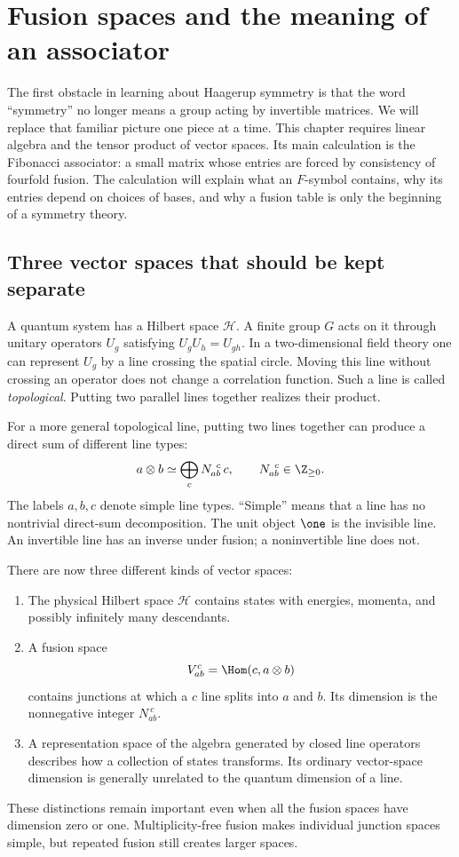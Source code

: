 \chapter{Fusion spaces and the meaning of an associator}
\label{ch:fusion}

The first obstacle in learning about Haagerup symmetry is that the word
``symmetry'' no longer means a group acting by invertible matrices.  We
will replace that familiar picture one piece at a time.  This chapter
requires linear algebra and the tensor product of vector spaces.  Its
main calculation is the Fibonacci associator: a small matrix whose
entries are forced by consistency of fourfold fusion.  The calculation
will explain what an $F$-symbol contains, why its entries depend on
choices of bases, and why a fusion table is only the beginning of a
symmetry theory.

\section{Three vector spaces that should be kept separate}

A quantum system has a Hilbert space $\mathscr H$.  A finite group $G$
acts on it through unitary operators $U_g$ satisfying
$U_gU_h=U_{gh}$.  In a two-dimensional field theory one can represent
$U_g$ by a line crossing the spatial circle.  Moving this line without
crossing an operator does not change a correlation function.  Such a
line is called \emph{topological}.  Putting two parallel lines together
realizes their product.

For a more general topological line, putting two lines together can
produce a direct sum of different line types:
\begin{equation}
 a\otimes b\simeq\bigoplus_c N_{ab}^{\ c}\,c,
 \qquad N_{ab}^{\ c}\in\Z_{\geq0}.
 \label{eq:fusion-rule-general}
\end{equation}
The labels $a,b,c$ denote simple line types.  ``Simple'' means that a
line has no nontrivial direct-sum decomposition.  The unit object
$\one$ is the invisible line.  An invertible line has an inverse under
fusion; a noninvertible line does not.

There are now three different kinds of vector spaces:
\begin{enumerate}
\item The physical Hilbert space $\mathscr H$ contains states with
energies, momenta, and possibly infinitely many descendants.
\item A fusion space
\[
 V_{ab}^{c}=\Hom(c,a\otimes b)
\]
contains junctions at which a $c$ line splits into $a$ and $b$.
Its dimension is the nonnegative integer $N_{ab}^{\ c}$.
\item A representation space of the algebra generated by closed
line operators describes how a collection of states transforms.  Its
ordinary vector-space dimension is generally unrelated to the quantum
dimension of a line.
\end{enumerate}
These distinctions remain important even when all the fusion spaces
have dimension zero or one.  Multiplicity-free fusion makes individual
junction spaces simple, but repeated fusion still creates larger spaces.

